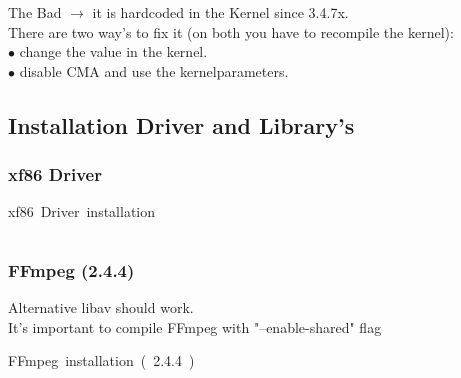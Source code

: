 \documentclass[11pt, a4paper,ngerman]{article}
\begin{document}
The Bad $\rightarrow$ it is hardcoded in the Kernel since 3.4.7x.\\

There are two way's to fix it (on both you have to recompile the kernel):\\
$\bullet$ change the value in the kernel. \\
$\bullet$ disable CMA and use the kernelparameters.

\subsection{Installation Driver and Library's}

\subsubsection{xf86 Driver}

\begin{mintedbox}[breakable=true,
 bottomrule=0.5mm,
 width=\paperwidth-3cm,
 boxsep=1mm, 
 enhanced=true,
 colframe = monoblack,
 drop fuzzy shadow,
 colback = black
 ]{xf86\ Driver\ installation}%
 

     \inputminted[firstline=3,lastline=10, 
     linenos=true, framesep=2mm, mathescape, numbersep=5pt,tabsize=4,%
]{bash}{includes/software.sh}%

\end{mintedbox}%

\subsubsection{FFmpeg (2.4.4)}

Alternative libav should work. \\

It's important to compile FFmpeg with "--enable-shared" flag \\

\begin{mintedbox}[breakable=true,
 bottomrule=0.5mm,
 width=\paperwidth-3cm,
 boxsep=1mm, 
 enhanced=true,
 colframe = monoblack,
 drop fuzzy shadow,
 colback = black
 ]{FFmpeg\ installation\ (\ 2.4.4\ )}%
 

     \inputminted[firstline=14,lastline=20, 
     linenos=true, framesep=2mm, mathescape, numbersep=5pt,tabsize=4,%
]{bash}{includes/software.sh}%

\end{mintedbox}%
\end{document}
